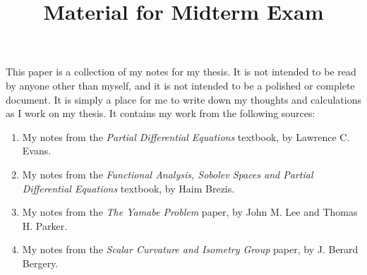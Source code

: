 \documentclass[notitlepage]{report}
\author{}
\date{}
\title{Material for Midterm Exam}
\theoremstyle{definition}
\begin{document}
  \maketitle
  \tableofcontents

  \begin{note*}
    This paper is a collection of my notes for my thesis. It is not intended to be read by anyone other than myself, and it is not intended to be a polished or complete document. It is simply a place for me to write down my thoughts and calculations as I work on my thesis. It contains my work from the following sources:
    \begin{enumerate}
      \item My notes from the \emph{Partial Differential Equations} textbook, by Lawrence C. Evans.
      \item My notes from the \emph{Functional Analysis, Sobolev Spaces and Partial Differential Equations} textbook, by Haim Brezis.
      \item My notes from the \emph{The Yamabe Problem} paper, by John M. Lee and Thomas H. Parker.
      \item My notes from the \emph{Scalar Curvature and Isometry Group} paper, by J. Berard Bergery.
    \end{enumerate}
  \end{note*}

  
  
  
  
  
  
  
  
  
  
\end{document}
